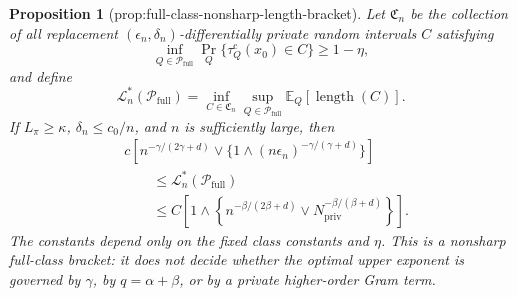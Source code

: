\documentclass{article}
\newtheorem{proposition}{Proposition}
\begin{document}
\begin{proposition}[prop:full-class-nonsharp-length-bracket]\label{prop:full-class-nonsharp-length-bracket}
Let \(\mathfrak C_n\) be the collection of all replacement \((\epsilon_n,\delta_n)\)-differentially private random intervals \(C\) satisfying
\[
 \inf_{Q\in\mathcal P_{\mathrm{full}}}
 \Pr_Q\{\tau_Q^{\mathrm c}(x_0)\in C\}\ge1-\eta,
\]
and define
\[
 \mathcal L_n^*(\mathcal P_{\mathrm{full}})
 =\inf_{C\in\mathfrak C_n}\sup_{Q\in\mathcal P_{\mathrm{full}}}
 \mathbb E_Q[\operatorname{length}(C)].
\]
If \(L_\pi\ge\kappa\), \(\delta_n\le c_0/n\), and \(n\) is sufficiently large, then
\[
 \begin{aligned}
 &c\left[n^{-\gamma/(2\gamma+d)}
 \vee\{1\wedge(n\epsilon_n)^{-\gamma/(\gamma+d)}\}\right]\\
 &\qquad\le \mathcal L_n^*(\mathcal P_{\mathrm{full}})\\
 &\qquad\le C\left[1\wedge\left\{n^{-\beta/(2\beta+d)}
 \vee N_{\mathrm{priv}}^{-\beta/(\beta+d)}\right\}\right].
 \end{aligned}
\]
The constants depend only on the fixed class constants and \(\eta\).  This is a nonsharp full-class bracket: it does not decide whether the optimal upper exponent is governed by \(\gamma\), by \(q=\alpha+\beta\), or by a private higher-order Gram term.
\end{proposition}
\end{document}

